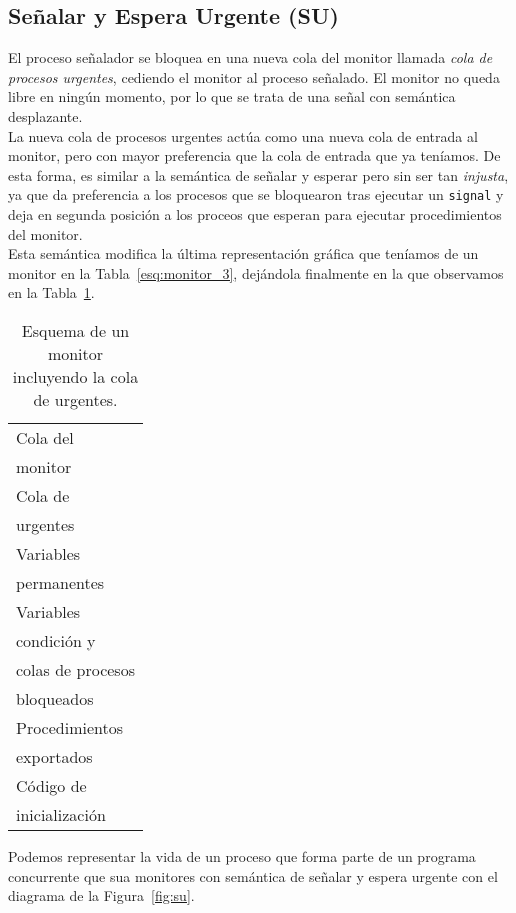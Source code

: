\subsection{Señalar y Espera Urgente (SU)}
El proceso señalador se bloquea en una nueva cola del monitor llamada \textit{cola de procesos urgentes}, cediendo el monitor al proceso señalado. El monitor no queda libre en ningún momento, por lo que se trata de una señal con semántica desplazante.\\

La nueva cola de procesos urgentes actúa como una nueva cola de entrada al monitor, pero con mayor preferencia que la cola de entrada que ya teníamos. De esta forma, es similar a la semántica de señalar y esperar pero sin ser tan \textit{injusta}, ya que da preferencia a los procesos que se bloquearon tras ejecutar un \verb|signal| y deja en segunda posición a los proceos que esperan para ejecutar procedimientos del monitor.\\

Esta semántica modifica la última representación gráfica que teníamos de un monitor en la Tabla~\ref{esq:monitor_3}, dejándola finalmente en la que observamos en la Tabla~\ref{esq:monitor_4}.

\begin{table}[H]
\centering
\begin{tabular}{|l|}
\hline
Cola del\\
monitor \\
\hline
Cola de\\
urgentes \\
\hline
Variables \\
permanentes \\
\hline
Variables \\
condición y\\
colas de procesos\\
bloqueados\\
\hline
Procedimientos \\
exportados \\
\hline
Código de \\ 
inicialización \\
\hline
\end{tabular}
\caption{Esquema de un monitor incluyendo la cola de urgentes.}
\label{esq:monitor_4}
\end{table}

Podemos representar la vida de un proceso que forma parte de un programa concurrente que sua monitores con semántica de señalar y espera urgente con el diagrama de la Figura~\ref{fig:su}.\\

